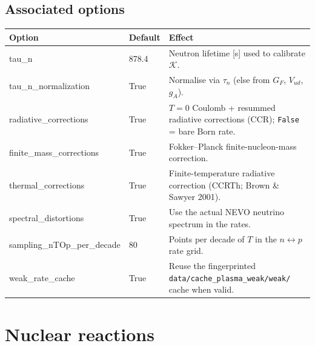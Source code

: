 \documentclass[11pt,a4paper]{article}
\newcommand{\code}[1]{\texttt{#1}}
\newcommand{\Kw}{\mathcal{K}}
\begin{document}
\subsection{Associated options}
\begin{center}\small
\begin{tabular}{>{\ttfamily}l l >{\raggedright\arraybackslash}p{8.4cm}}
\toprule
\normalfont Option & Default & Effect \\
\midrule
tau\_n                  & 878.4 & Neutron lifetime [s] used to calibrate $\Kw$. \\
tau\_n\_normalization   & True  & Normalise via $\tau_n$ (else from $G_F$, $V_{ud}$, $g_A$). \\
radiative\_corrections  & True  & $T=0$ Coulomb + resummed radiative corrections (CCR); \code{False} = bare Born rate. \\
finite\_mass\_corrections & True & Fokker--Planck finite-nucleon-mass correction. \\
thermal\_corrections    & True  & Finite-temperature radiative correction (CCRTh; Brown \& Sawyer 2001). \\
spectral\_distortions   & True  & Use the actual NEVO neutrino spectrum in the rates. \\
sampling\_nTOp\_per\_decade & 80 & Points per decade of $T$ in the $n\leftrightarrow p$ rate grid. \\
weak\_rate\_cache       & True  & Reuse the fingerprinted \code{data/cache\_plasma\_weak/weak/} cache when valid. \\
\bottomrule
\end{tabular}
\end{center}

\section{Nuclear reactions}\label{sec:nuclear}
\end{document}
